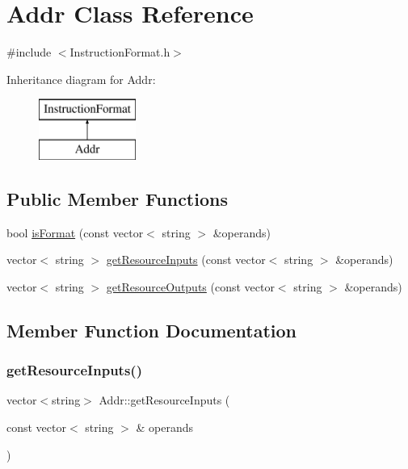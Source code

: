 \hypertarget{classAddr}{}\section{Addr Class Reference}
\label{classAddr}


{\ttfamily \#include $<$Instruction\+Format.\+h$>$}

Inheritance diagram for Addr\+:\begin{figure}[H]
\begin{center}
\leavevmode
\includegraphics[height=2.000000cm]{classAddr}
\end{center}
\end{figure}
\subsection*{Public Member Functions}
\begin{DoxyCompactItemize}
\item 
bool \hyperlink{classAddr_aff6fd4bf7c93990b1427843fff9069ed}{is\+Format} (const vector$<$ string $>$ \&operands)
\item 
vector$<$ string $>$ \hyperlink{classAddr_a0ed20cdb01d8b11b023fa3b5e54bab29}{get\+Resource\+Inputs} (const vector$<$ string $>$ \&operands)
\item 
vector$<$ string $>$ \hyperlink{classAddr_aa42b861112df7333d93b3dd242e6621b}{get\+Resource\+Outputs} (const vector$<$ string $>$ \&operands)
\end{DoxyCompactItemize}


\subsection{Member Function Documentation}
\mbox{\label{classAddr_a0ed20cdb01d8b11b023fa3b5e54bab29}} 
\subsubsection{\texorpdfstring{get\+Resource\+Inputs()}{getResourceInputs()}}
{\footnotesize\ttfamily vector$<$string$>$ Addr\+::get\+Resource\+Inputs (\begin{DoxyParamCaption}\item[{const vector$<$ string $>$ \&}]{operands }\end{DoxyParamCaption})\hspace{0.3cm}{\ttfamily [virtual]}}

